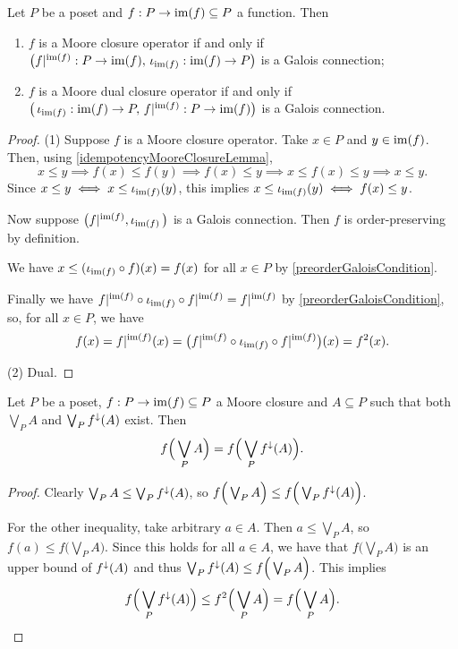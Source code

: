 \begin{proposition} \label{MooreClosureGaloisConnection}
Let $P$ be a poset and $f: P\to \operatorname{im}(f)\subseteq P$ a function. Then
\begin{enumerate}
\item $f$ is a Moore closure operator \textup{if and only if}
$\big(f|^{\operatorname{im}(f)}:P\to \operatorname{im}(f),\, \operatorname{\iota}_{\operatorname{im}(f)}: \operatorname{im}(f)\to P\big)$ is a Galois connection;
\item $f$ is a Moore dual closure operator \textup{if and only if} $\big(\operatorname{\iota}_{\operatorname{im}(f)}: \operatorname{im}(f)\to P,\, f|^{\operatorname{im}(f)}:P\to \operatorname{im}(f)\big)$ is a Galois connection.
\end{enumerate}
\end{proposition}
\begin{proof}
(1) Suppose $f$ is a Moore closure operator. Take $x\in P$ and $y\in \operatorname{im}(f)$. Then, using \ref{idempotencyMooreClosureLemma},
\[ x\leq y \implies f(x)\leq f(y) \implies f(x) \leq y \implies x\leq f(x)\leq y \implies x\leq y. \]
Since $x\leq y \iff x\leq \iota_{\operatorname{im}(f)}(y)$, this implies $x\leq \iota_{\operatorname{im}(f)}(y) \iff f(x) \leq y$.

Now suppose $\big(f|^{\operatorname{im}(f)}, \operatorname{\iota}_{\operatorname{im}(f)}\big)$ is a Galois connection. Then $f$ is order-preserving by definition.

We have $x \leq (\iota_{\operatorname{im}(f)}\circ f)(x) = f(x)$ for all $x\in P$ by \ref{preorderGaloisCondition}.

Finally we have $f|^{\operatorname{im}(f)}\circ \iota_{\operatorname{im}(f)}\circ f|^{\operatorname{im}(f)} = f|^{\operatorname{im}(f)}$ by \ref{preorderGaloisCondition}, so, for all $x\in P$, we have
\[ f(x) = f|^{\operatorname{im}(f)}(x) = \big(f|^{\operatorname{im}(f)}\circ \iota_{\operatorname{im}(f)}\circ f|^{\operatorname{im}(f)}\big)(x) = f^2(x). \]

(2) Dual.
\end{proof}

\begin{lemma} \label{closureContinuityJoin}
Let $P$ be a poset, $f: P\to \operatorname{im}(f)\subseteq P$ a Moore closure and $A\subseteq P$ such that both $\bigvee_P A$ and $\bigvee_P f^\downarrow(A)$ exist. Then
\[ f\Big(\bigvee_P A\Big) = f\Big(\bigvee_P f^\downarrow(A)\Big). \]
\end{lemma}
\begin{proof}
Clearly $\bigvee_P A \leq \bigvee_P f^\downarrow(A)$, so $f\Big(\bigvee_P A\Big) \leq f\Big(\bigvee_P f^\downarrow(A)\Big)$.

For the other inequality, take arbitrary $a\in A$. Then $a\leq \bigvee_P A$, so $f(a) \leq f\Big(\bigvee_P A\Big)$. Since this holds for all $a\in A$, we have that $f\Big(\bigvee_P A\Big)$ is an upper bound of $f^\downarrow(A)$ and thus $\bigvee_P f^\downarrow(A) \leq f\Big(\bigvee_P A\Big)$. This implies
\[ f\Big(\bigvee_P f^\downarrow(A)\Big) \leq f^2\Big(\bigvee_P A\Big) = f\Big(\bigvee_P A\Big). \]
\end{proof}

